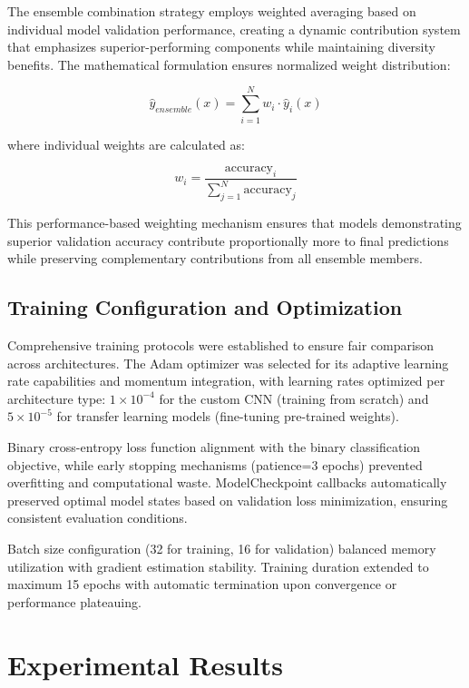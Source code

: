 \documentclass[conference]{IEEEtran}
\begin{document}
The ensemble combination strategy employs weighted averaging based on individual model validation performance, creating a dynamic contribution system that emphasizes superior-performing components while maintaining diversity benefits. The mathematical formulation ensures normalized weight distribution:

\begin{equation}
\hat{y}_{ensemble}(x) = \sum_{i=1}^{N} w_i \cdot \hat{y}_i(x)
\end{equation}

where individual weights are calculated as:

\begin{equation}
w_i = \frac{\text{accuracy}_i}{\sum_{j=1}^{N} \text{accuracy}_j}
\end{equation}

This performance-based weighting mechanism ensures that models demonstrating superior validation accuracy contribute proportionally more to final predictions while preserving complementary contributions from all ensemble members.

\subsection{Training Configuration and Optimization}

Comprehensive training protocols were established to ensure fair comparison across architectures. The Adam optimizer was selected for its adaptive learning rate capabilities and momentum integration, with learning rates optimized per architecture type: $1 \times 10^{-4}$ for the custom CNN (training from scratch) and $5 \times 10^{-5}$ for transfer learning models (fine-tuning pre-trained weights).

Binary cross-entropy loss function alignment with the binary classification objective, while early stopping mechanisms (patience=3 epochs) prevented overfitting and computational waste. ModelCheckpoint callbacks automatically preserved optimal model states based on validation loss minimization, ensuring consistent evaluation conditions.

Batch size configuration (32 for training, 16 for validation) balanced memory utilization with gradient estimation stability. Training duration extended to maximum 15 epochs with automatic termination upon convergence or performance plateauing.

\section{Experimental Results}
\end{document}
